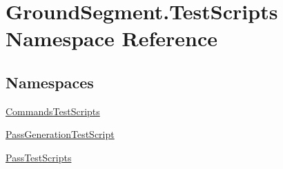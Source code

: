 \hypertarget{namespace_ground_segment_1_1_test_scripts}{}\section{Ground\+Segment.\+Test\+Scripts Namespace Reference}
\label{namespace_ground_segment_1_1_test_scripts}
\subsection*{Namespaces}
\begin{DoxyCompactItemize}
\item 
 \hyperlink{namespace_ground_segment_1_1_test_scripts_1_1_commands_test_scripts}{Commands\+Test\+Scripts}
\item 
 \hyperlink{namespace_ground_segment_1_1_test_scripts_1_1_pass_generation_test_script}{Pass\+Generation\+Test\+Script}
\item 
 \hyperlink{namespace_ground_segment_1_1_test_scripts_1_1_pass_test_scripts}{Pass\+Test\+Scripts}
\end{DoxyCompactItemize}
